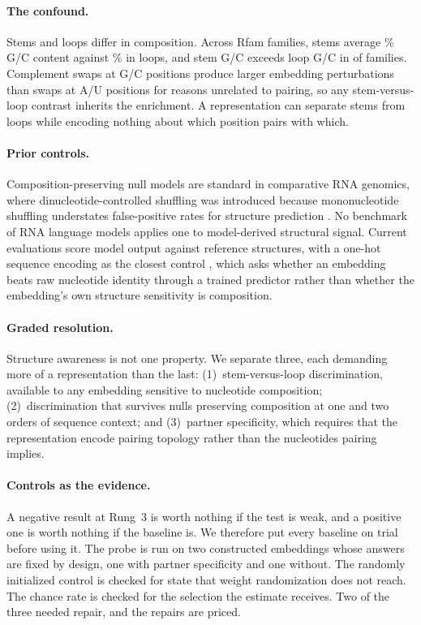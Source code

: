 \documentclass{article}
\begin{document}
\paragraph{The confound.} Stems and loops differ in composition. Across
\panelN{} Rfam families, stems average \panelStemGC{}\% G/C content against
\panelLoopGC{}\% in loops, and stem G/C exceeds loop G/C in \panelGCEnriched{}
of \panelGCScored{} families. Complement swaps at G/C positions produce larger
embedding perturbations than swaps at A/U positions for reasons unrelated to
pairing, so any stem-versus-loop contrast inherits the enrichment. A
representation can separate stems from loops while encoding nothing about which
position pairs with which.

\paragraph{Prior controls.} Composition-preserving null models are standard in
comparative RNA genomics, where dinucleotide-controlled shuffling was introduced
because mononucleotide shuffling understates false-positive rates for structure
prediction \citep{gesell2008dinucleotide, anandam2009multiperm}. No benchmark of
RNA language models applies one to model-derived structural signal. Current
evaluations score model output against reference structures, with a one-hot
sequence encoding as the closest control \citep{zablocki2025benchmarking}, which
asks whether an embedding beats raw nucleotide identity through a trained
predictor rather than whether the embedding's own structure sensitivity is
composition.

\paragraph{Graded resolution.} Structure awareness is not one property. We
separate three, each demanding more of a representation than the last:
(1)~stem-versus-loop discrimination, available to any embedding sensitive to
nucleotide composition; (2)~discrimination that survives nulls preserving
composition at one and two orders of sequence context; and (3)~partner
specificity, which requires that the representation encode pairing topology
rather than the nucleotides pairing implies.

\paragraph{Controls as the evidence.} A negative result at Rung~3 is worth
nothing if the test is weak, and a positive one is worth nothing if the baseline
is. We therefore put every baseline on trial before using it. The probe is run
on two constructed embeddings whose answers are fixed by design, one with partner
specificity and one without. The randomly initialized control is checked for
state that weight randomization does not reach. The chance rate is checked for
the selection the estimate receives. Two of the three needed repair, and the
repairs are priced.
\end{document}
